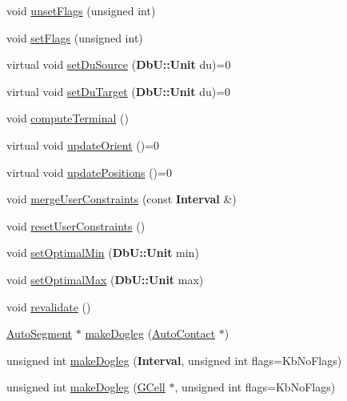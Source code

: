 \begin{DoxyCompactItemize}
\item 
void \hyperlink{classKatabatic_1_1AutoSegment_a1a6fac115cb81db48e3ac9ffa0721bb5}{unset\-Flags} (unsigned int)
\item 
void \hyperlink{classKatabatic_1_1AutoSegment_aeb14f94914af58657a0dc2f50ec98df5}{set\-Flags} (unsigned int)
\item 
virtual void \hyperlink{classKatabatic_1_1AutoSegment_aaf60d18ab6d951a34a3d06959ce2e76f}{set\-Du\-Source} ({\bf Db\-U\-::\-Unit} du)=0
\item 
virtual void \hyperlink{classKatabatic_1_1AutoSegment_a246756d4c8b3e094a0a9d6de3c2109ff}{set\-Du\-Target} ({\bf Db\-U\-::\-Unit} du)=0
\item 
void \hyperlink{classKatabatic_1_1AutoSegment_abc72aaeefa7450eaf67aee3212ec974d}{compute\-Terminal} ()
\item 
virtual void \hyperlink{classKatabatic_1_1AutoSegment_a102e0f4bbb0386e41be214d15a9e4549}{update\-Orient} ()=0
\item 
virtual void \hyperlink{classKatabatic_1_1AutoSegment_a6d95f4de39c13611786c95ddc7b8942e}{update\-Positions} ()=0
\item 
void \hyperlink{classKatabatic_1_1AutoSegment_ae82ffef92ad9ffdc5da5e0c1830d9537}{merge\-User\-Constraints} (const {\bf Interval} \&)
\item 
void \hyperlink{classKatabatic_1_1AutoSegment_ac8768352909d37ebad1c06c9cf4ef8bb}{reset\-User\-Constraints} ()
\item 
void \hyperlink{classKatabatic_1_1AutoSegment_af92b3d000552b630695879dd5d4736a1}{set\-Optimal\-Min} ({\bf Db\-U\-::\-Unit} min)
\item 
void \hyperlink{classKatabatic_1_1AutoSegment_a90173ab4f35b98c6544f9482ccd93b5e}{set\-Optimal\-Max} ({\bf Db\-U\-::\-Unit} max)
\item 
void \hyperlink{classKatabatic_1_1AutoSegment_a88ac40c065bce0ff97792d18b41b6a67}{revalidate} ()
\item 
\hyperlink{classKatabatic_1_1AutoSegment}{Auto\-Segment} $\ast$ \hyperlink{classKatabatic_1_1AutoSegment_a39c927c04b5016770692b9b8448c2f04}{make\-Dogleg} (\hyperlink{classKatabatic_1_1AutoContact}{Auto\-Contact} $\ast$)
\item 
unsigned int \hyperlink{classKatabatic_1_1AutoSegment_a5ca22c853ee33a2b26367eaf29457766}{make\-Dogleg} ({\bf Interval}, unsigned int flags=Kb\-No\-Flags)
\item 
unsigned int \hyperlink{classKatabatic_1_1AutoSegment_aa21b16647c1750ba8b3eb9d99b12f073}{make\-Dogleg} (\hyperlink{classKatabatic_1_1GCell}{G\-Cell} $\ast$, unsigned int flags=Kb\-No\-Flags)

\end{DoxyCompactItemize}
